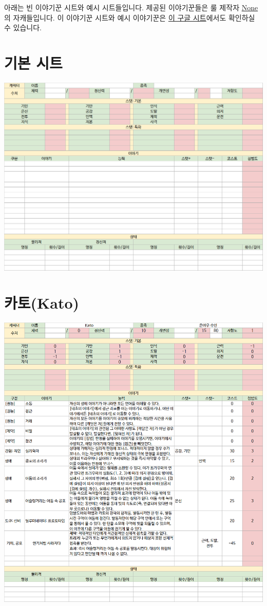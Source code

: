 \documentclass{report}
\begin{document}
	아래는 빈 이야기꾼 시트와 예시 시트들입니다. 제공된 이야기꾼들은 룰 제작자 \href{https://www.twitter.com/n0n3x1573n7_WS}{None}의 자캐들입니다. 이 이야기꾼 시트와 예시 이야기꾼은 \href{https://docs.google.com/spreadsheets/d/1g3ZO-oALMVbytbE2tvSBdT6czxB32XHZ1crWIGavEhQ/edit?usp=sharing}{이 구글 시트}에서도 확인하실 수 있습니다.
	
	\section*{기본 시트}
		\includegraphics[width=\textwidth]{./Chapters/WoS/sheets/base.png}
	
	\section*{카토(Kato)}
		\includegraphics[width=\textwidth]{./Chapters/WoS/sheets/kato.png}
	
\end{document}
